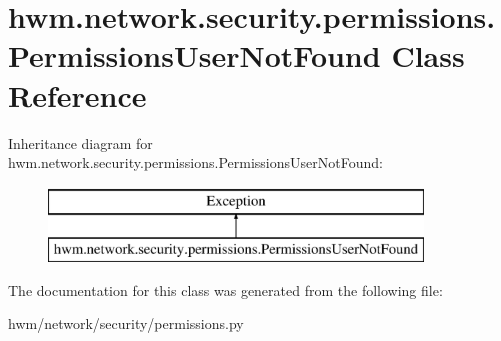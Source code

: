 \hypertarget{classhwm_1_1network_1_1security_1_1permissions_1_1_permissions_user_not_found}{\section{hwm.\-network.\-security.\-permissions.\-Permissions\-User\-Not\-Found Class Reference}
\label{classhwm_1_1network_1_1security_1_1permissions_1_1_permissions_user_not_found}
}
Inheritance diagram for hwm.\-network.\-security.\-permissions.\-Permissions\-User\-Not\-Found\-:\begin{figure}[H]
\begin{center}
\leavevmode
\includegraphics[height=2.000000cm]{classhwm_1_1network_1_1security_1_1permissions_1_1_permissions_user_not_found}
\end{center}
\end{figure}


The documentation for this class was generated from the following file\-:\begin{DoxyCompactItemize}
\item 
hwm/network/security/permissions.\-py\end{DoxyCompactItemize}
